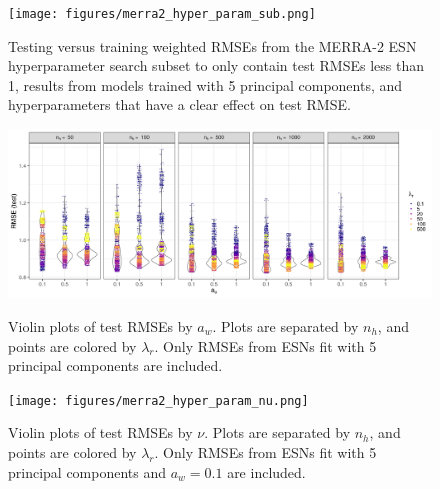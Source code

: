 \documentclass[AMS,STIX2COL]{WileyNJD-v2}
\begin{document}
\begin{figure}[h]
    \centering
    \texttt{[image: figures/merra2\_hyper\_param\_sub.png]}
    \caption{Testing versus training weighted RMSEs from the MERRA-2 ESN hyperparameter search subset to only contain test RMSEs less than 1, results from models trained with 5 principal components, and hyperparameters that have a clear effect on test RMSE.}
    \label{fig:hp_sub}
\end{figure}

\begin{figure}[h]
    \centering
    \includegraphics[width=\textwidth]{figures/merra2_hyper_param_uwidth.png}
    \caption{Violin plots of test RMSEs by $a_w$. Plots are separated by $n_h$, and points are colored by $\lambda_r$. Only RMSEs from ESNs fit with 5 principal components are included.}
    \label{fig:hp_uwidth}
    \vspace{1cm}
    \texttt{[image: figures/merra2\_hyper\_param\_nu.png]}
    \caption{Violin plots of test RMSEs by $\nu$. Plots are separated by $n_h$, and points are colored by $\lambda_r$. Only RMSEs from ESNs fit with 5 principal components and $a_w=0.1$ are included.}
    \label{fig:hp_nu}
\end{figure}
\end{document}

